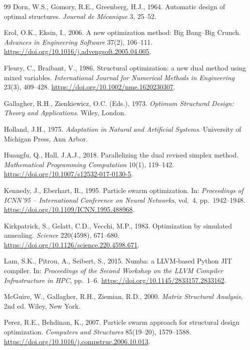 \documentclass[lineno,pdflatex,sn-mathphys-num]{sn-jnl}
\begin{document}
\begin{thebibliography}{99}
Dorn, W.S., Gomory, R.E., Greenberg, H.J., 1964.
Automatic design of optimal structures.
\textit{Journal de M\'{e}canique} 3, 25--52.

Erol, O.K., Eksin, I., 2006.
A new optimization method: Big Bang--Big Crunch.
\textit{Advances in Engineering Software} 37(2), 106--111.
\url{https://doi.org/10.1016/j.advengsoft.2005.04.005}.

Fleury, C., Braibant, V., 1986.
Structural optimization: a new dual method using mixed variables.
\textit{International Journal for Numerical Methods in Engineering} 23(3), 409--428.
\url{https://doi.org/10.1002/nme.1620230307}.

Gallagher, R.H., Zienkiewicz, O.C. (Eds.), 1973.
\textit{Optimum Structural Design: Theory and Applications}.
Wiley, London.

Holland, J.H., 1975.
\textit{Adaptation in Natural and Artificial Systems}.
University of Michigan Press, Ann Arbor.

Huangfu, Q., Hall, J.A.J., 2018.
Parallelizing the dual revised simplex method.
\textit{Mathematical Programming Computation} 10(1), 119--142.
\url{https://doi.org/10.1007/s12532-017-0130-5}.

Kennedy, J., Eberhart, R., 1995.
Particle swarm optimization.
In: \textit{Proceedings of ICNN'95 -- International Conference on Neural Networks},
vol.~4, pp.~1942--1948.
\url{https://doi.org/10.1109/ICNN.1995.488968}.

Kirkpatrick, S., Gelatt, C.D., Vecchi, M.P., 1983.
Optimization by simulated annealing.
\textit{Science} 220(4598), 671--680.
\url{https://doi.org/10.1126/science.220.4598.671}.


Lam, S.K., Pitrou, A., Seibert, S., 2015.
Numba: a LLVM-based Python JIT compiler.
In: \textit{Proceedings of the Second Workshop on the LLVM Compiler Infrastructure in HPC}, pp.~1--6.
\url{https://doi.org/10.1145/2833157.2833162}.

McGuire, W., Gallagher, R.H., Ziemian, R.D., 2000.
\textit{Matrix Structural Analysis}, 2nd ed.
Wiley, New York.

Perez, R.E., Behdinan, K., 2007.
Particle swarm approach for structural design optimization.
\textit{Computers and Structures} 85(19--20), 1579--1588.
\url{https://doi.org/10.1016/j.compstruc.2006.10.013}.


\end{thebibliography}
\end{document}
